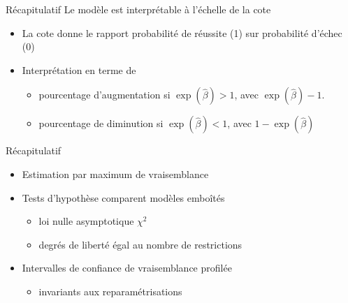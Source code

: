 \documentclass[
  ignorenonframetext,
]{beamer}
\providecommand{\tightlist}{%
  \setlength{\itemsep}{0pt}\setlength{\parskip}{0pt}}\usepackage{longtable,booktabs,array}
\begin{document}
\begin{frame}{Récapitulatif}
\protect\hypertarget{ruxe9capitulatif-1}{}
Le modèle est interprétable à l'échelle de la cote

\begin{itemize}
\tightlist
\item
  La cote donne le rapport probabilité de réussite (1) sur probabilité
  d'échec (0)
\item
  Interprétation en terme de

  \begin{itemize}
  \tightlist
  \item
    pourcentage d'augmentation si \(\exp(\widehat{\beta}) > 1\), avec
    \(\exp(\widehat{\beta})-1\).
  \item
    pourcentage de diminution si \(\exp(\widehat{\beta}) < 1\), avec
    \(1-\exp(\widehat{\beta})\)
  \end{itemize}
\end{itemize}
\end{frame}

\begin{frame}{Récapitulatif}
\protect\hypertarget{ruxe9capitulatif-2}{}
\begin{itemize}
\tightlist
\item
  Estimation par maximum de vraisemblance
\item
  Tests d'hypothèse comparent modèles emboîtés

  \begin{itemize}
  \tightlist
  \item
    loi nulle asymptotique \(\chi^2\)
  \item
    degrés de liberté égal au nombre de restrictions
  \end{itemize}
\item
  Intervalles de confiance de vraisemblance profilée

  \begin{itemize}
  \tightlist
  \item
    invariants aux reparamétrisations
  \end{itemize}
\end{itemize}
\end{frame}
\end{document}
